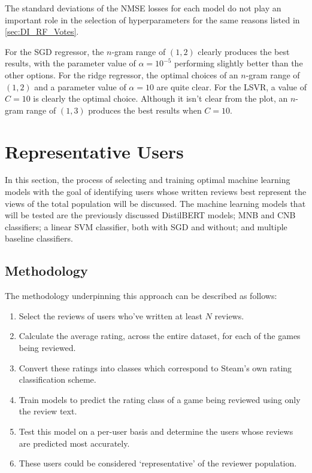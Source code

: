 The standard deviations of the NMSE losses for each model do not play an important role in the selection of hyperparameters for the same reasons listed in \ref{sec:DI_RF_Votes}.

For the SGD regressor, the $n$-gram range of $(1, 2)$ clearly produces the best results, with the parameter value of $\alpha=10^{-5}$ performing slightly better than the other options. For the ridge regressor, the optimal choices of an $n$-gram range of $(1, 2)$ and a parameter value of $\alpha=10$ are quite clear. For the LSVR, a value of $C=10$ is clearly the optimal choice. Although it isn't clear from the plot, an $n$-gram range of $(1, 3)$ produces the best results when $C=10$.

\section{Representative Users} \label{sec:DI_RU}

In this section, the process of selecting and training optimal machine learning models with the goal of identifying users whose written reviews best represent the views of the total population will be discussed. The machine learning models that will be tested are the previously discussed DistilBERT models; MNB and CNB classifiers; a linear SVM classifier, both with SGD and without; and multiple baseline classifiers.

\subsection{Methodology}

The methodology underpinning this approach can be described as follows:

\begin{enumerate}
    \item Select the reviews of users who've written at least $N$ reviews.
    \item Calculate the average rating, across the entire dataset, for each of the games being reviewed.
    \item Convert these ratings into classes which correspond to Steam's own rating classification scheme.
    \item Train models to predict the rating class of a game being reviewed using only the review text.
    \item Test this model on a per-user basis and determine the users whose reviews are predicted most accurately.
    \item These users could be considered `representative' of the reviewer population.
\end{enumerate}

